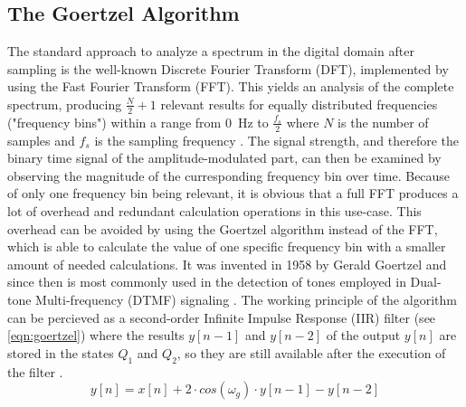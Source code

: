 \documentclass[conference]{IEEEtran}
\begin{document}
\subsection{The Goertzel Algorithm}
The standard approach to analyze a spectrum in the digital domain after sampling is the well-known Discrete Fourier Transform (DFT), implemented by using
the Fast Fourier Transform (FFT). This yields an analysis of the complete spectrum, producing $\frac{N}{2} + 1$ relevant results for equally distributed frequencies
("frequency bins") within a range from \SI{0}{\hertz} to $\frac{f_{s}}{2}$ where $N$ is the number of samples and $f_{s}$ is the sampling frequency \cite{b6}.
The signal strength, and therefore the binary time signal of the amplitude-modulated part, can then be examined by observing the magnitude of the curresponding frequency bin
over time. Because of only one frequency bin being relevant, it is obvious that a full FFT produces a lot of overhead and redundant calculation operations in this use-case. 
This overhead can be avoided by using the Goertzel algorithm instead of the FFT, which is able to calculate the value of one specific frequency bin with a smaller
amount of needed calculations.
It was invented in 1958 by Gerald Goertzel and since then is most commonly used in the detection of tones employed in Dual-tone Multi-frequency (DTMF) signaling \cite{b7}.
The working principle of the algorithm can be percieved as a second-order Infinite Impulse Response (IIR) filter (see \eqref{eqn:goertzel}) where the results $y[n-1]$ and $y[n-2]$ of the output $y[n]$
are stored in the states $Q_{1}$ and $Q_{2}$, so they are still available after the execution of the filter \cite{b8}.
\begin{equation}
    y[n] = x[n] + 2 \cdot cos(\omega_{g}) \cdot y[n-1] - y[n-2]
    \label{eqn:goertzel}
\end{equation}
\end{document}
